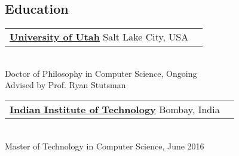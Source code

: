 \documentclass[margin,line]{res}
\begin{document}
\begin{resume}


\section{\sc Education}
 \begin{tabular}{@{}p{5.5in}p{4in}}
  {\bf \href{http://www.cs.utah.edu/}{University of Utah}} \dotfill Salt Lake City,
  USA
 \end{tabular}
 \\ {\small Doctor of Philosophy in Computer Science, Ongoing}
 \\ {\small Advised by Prof. Ryan Stutsman}

 \vspace{-2.5pt}
 \begin{tabular}{@{}p{5.5in}p{4in}}
  {\bf \href{http://www.cse.iitb.ac.in/}{Indian Institute of
  Technology}} \dotfill Bombay, India
 \end{tabular}
 \\ {\small Master of Technology in Computer Science, June 2016}



\end{resume}
\end{document}
